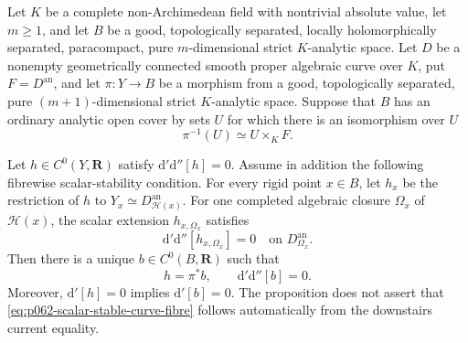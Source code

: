 
\begin{proposition}
\label{prop:p062-scalar-stable-proper-curve-bundle-descent}
Let $K$ be a complete non-Archimedean field with nontrivial absolute value,
let $m\geq1$, and let $B$ be a good, topologically separated, locally
holomorphically separated, paracompact, pure $m$-dimensional strict
$K$-analytic space.  Let $D$ be a nonempty geometrically connected smooth
proper algebraic curve over $K$, put $F=D^{\mathrm{an}}$, and let
$\pi:Y\to B$ be a morphism from a good, topologically separated, pure
$(m+1)$-dimensional strict $K$-analytic space.  Suppose that $B$ has an
ordinary analytic open cover by sets $U$ for which there is an isomorphism
over $U$
\[
                         \pi^{-1}(U)\simeq U\times_KF.
\]

Let $h\in C^0(Y,\mathbf R)$ satisfy
$\mathrm d'\mathrm d''[h]=0$.  Assume in addition the following
fibrewise scalar-stability condition.  For every rigid point $x\in B$, let
$h_x$ be the restriction of $h$ to
$Y_x\simeq D_{\mathscr H(x)}^{\mathrm{an}}$.  For one completed algebraic
closure $\Omega_x$ of $\mathscr H(x)$, the scalar extension
$h_{x,\Omega_x}$ satisfies
\begin{equation}
             \mathrm d'\mathrm d''[h_{x,\Omega_x}]=0
             \quad\text{on }D_{\Omega_x}^{\mathrm{an}}.
 \label{eq:p062-scalar-stable-curve-fibre}
\end{equation}
Then there is a unique $b\in C^0(B,\mathbf R)$ such that
\begin{equation}
                         h=\pi^*b,
                         \qquad
                         \mathrm d'\mathrm d''[b]=0.
 \label{eq:p062-scalar-stable-curve-descent}
\end{equation}
Moreover, $\mathrm d'[h]=0$ implies $\mathrm d'[b]=0$.
The proposition does not assert that
\eqref{eq:p062-scalar-stable-curve-fibre} follows automatically from the
downstairs current equality.
\end{proposition}
